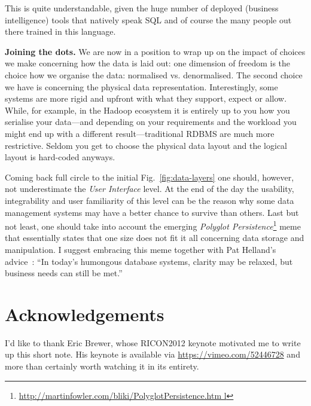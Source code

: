 \documentclass{llncs}
\begin{document}
This is quite understandable, given the huge number of deployed (business 
intelligence) tools that natively speak SQL and of course the many people out 
there trained in this language.

\textbf{Joining the dots.} We are now in a position to wrap up on the 
impact of choices we make concerning how the data is laid out: one dimension of
freedom is the choice how we organise the data: normalised vs. denormalised. 
The second choice we have is concerning the physical data representation.
Interestingly, some systems are more rigid and upfront with what they support,
expect or allow. While, for example, in the Hadoop ecosystem it is entirely up
to you how you serialise your data---and depending on your requirements and
the workload you might end up with a different result---traditional RDBMS are
much more restrictive. Seldom you get to choose the physical data layout and
the logical layout is hard-coded anyways.

Coming back full circle to the initial Fig.~\ref{fig:data-layers} one should,
however, not underestimate the \emph{User Interface} level. At the end of the
day the usability, integrability and user familiarity of this level can be
the reason why some data management systems may have a better chance to survive
than others. Last but not least, one should take into account the emerging
\emph{Polyglot 
Persistence}\footnote{\url{http://martinfowler.com/bliki/PolyglotPersistence.htm
l}} meme that essentially states that one size does not fit it all concerning
data storage and manipulation. I suggest embracing this meme together with Pat
Helland's advice~\cite{Helland:ACMQ1}: ``In today's humongous database systems, 
clarity may be relaxed, but business needs can still be met.''


\section{Acknowledgements}
\label{sec:ack}
I'd like to thank Eric Brewer, whose RICON2012 keynote motivated me to write up
this short note. His keynote is available via \url{https://vimeo.com/52446728} 
and more than certainly worth watching it in its entirety. 



\end{document}
